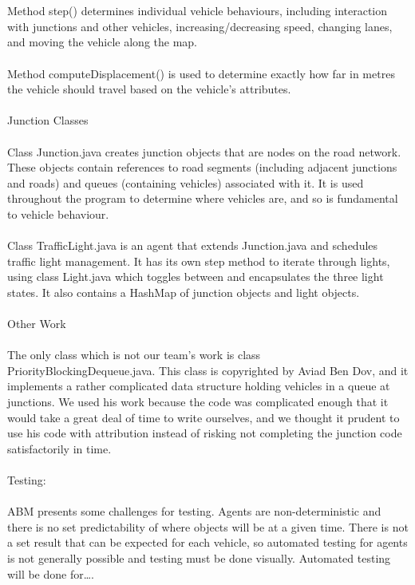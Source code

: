 \documentclass[11pt]{article}
\begin{document}
\\ \\
Method step() determines individual vehicle behaviours, including interaction with junctions and other vehicles, increasing/decreasing speed, changing lanes, and moving the vehicle along the map. 
\\ \\
Method computeDisplacement() is used to determine exactly how far in metres the vehicle  should travel based on the vehicle’s attributes. 
\\ \\
Junction Classes
\\ \\
Class Junction.java creates junction objects that are nodes on the road network. These objects contain references to road segments (including adjacent junctions and roads) and queues (containing vehicles) associated with it. It is used throughout the program to determine where vehicles are, and so is fundamental to vehicle behaviour.
\\ \\
Class TrafficLight.java is an agent that extends Junction.java and schedules traffic light management. It has its own step method to iterate through lights, using class Light.java which toggles between and encapsulates the three light states. It also contains a HashMap of junction objects and light objects. 
\\ \\
Other Work
\\ \\
The only class which is not our team’s work is class PriorityBlockingDequeue.java. This class is copyrighted by Aviad Ben Dov, and it implements a rather complicated data structure holding vehicles in a queue at junctions. We used his work because the code was complicated enough that it would take a great deal of time to write ourselves, and we thought it prudent to use his code with attribution instead of risking not completing the junction code satisfactorily in time.
\\ \\

Testing:		
\\ \\
ABM presents some challenges for testing. Agents are non-deterministic and there is no set predictability of where objects will be at a given time. There is not a set result that can be expected for each vehicle, so automated testing for agents is not generally possible and testing must be done visually. Automated testing will be done for….
\\ \\
[Adeela’s report content summarized and report document attached]
\\ \\
\end{document}
